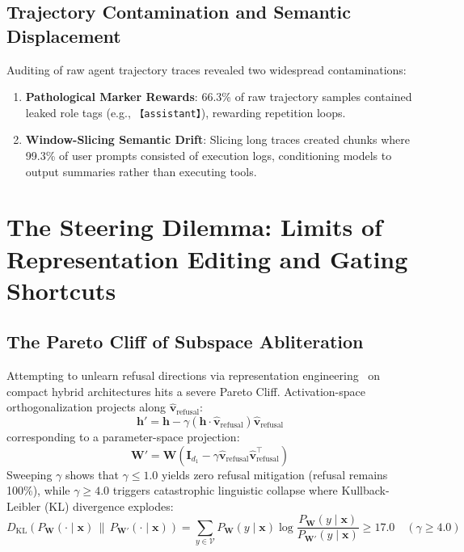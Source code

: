 \documentclass{article}
\begin{document}
\subsection{Trajectory Contamination and Semantic Displacement}
Auditing of raw agent trajectory traces revealed two widespread contaminations:
\begin{enumerate}
    \item \textbf{Pathological Marker Rewards}: 66.3\% of raw trajectory samples contained leaked role tags (e.g., \texttt{【assistant】}), rewarding repetition loops.
    \item \textbf{Window-Slicing Semantic Drift}: Slicing long traces created chunks where 99.3\% of user prompts consisted of execution logs, conditioning models to output summaries rather than executing tools.
\end{enumerate}

\section{The Steering Dilemma: Limits of Representation Editing and Gating Shortcuts}

\subsection{The Pareto Cliff of Subspace Abliteration}
Attempting to unlearn refusal directions via representation engineering~\cite{arditi2024refusal} on compact hybrid architectures hits a severe Pareto Cliff. Activation-space orthogonalization projects along $\hat{\mathbf{v}}_{\text{refusal}}$:
\begin{equation}
\label{eq:activation_abliteration}
\mathbf{h}' = \mathbf{h} - \gamma (\mathbf{h} \cdot \hat{\mathbf{v}}_{\text{refusal}}) \hat{\mathbf{v}}_{\text{refusal}}
\end{equation}
corresponding to a parameter-space projection:
\begin{equation}
\label{eq:weight_abliteration}
\mathbf{W}' = \mathbf{W} \left( \mathbf{I}_{d_1} - \gamma \hat{\mathbf{v}}_{\text{refusal}} \hat{\mathbf{v}}_{\text{refusal}}^\top \right)
\end{equation}
Sweeping $\gamma$ shows that $\gamma \le 1.0$ yields zero refusal mitigation (refusal remains 100\%), while $\gamma \ge 4.0$ triggers catastrophic linguistic collapse where Kullback-Leibler (KL) divergence explodes:
\begin{equation}
\label{eq:kl_collapse}
D_{\text{KL}}(P_{\mathbf{W}}(\cdot \mid \mathbf{x}) \,\|\, P_{\mathbf{W}'}(\cdot \mid \mathbf{x})) = \sum_{y \in \mathcal{V}} P_{\mathbf{W}}(y \mid \mathbf{x}) \log \frac{P_{\mathbf{W}}(y \mid \mathbf{x})}{P_{\mathbf{W}'}(y \mid \mathbf{x})} \ge 17.0 \quad (\gamma \ge 4.0)
\end{equation}
\end{document}
